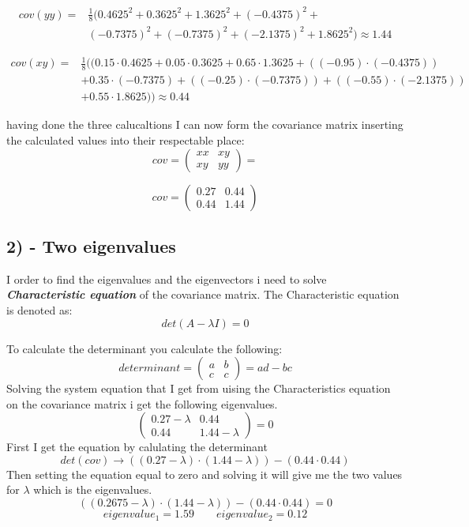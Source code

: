 \begin{equation}
    \begin{split}
        cov(yy) = & \frac{1}{8} \Big(0.4625^2 + 0.3625^2 + 1.3625^2 + (-0.4375)^2 + \\
                  &(-0.7375)^2 + (-0.7375)^2 + (-2.1375)^2 + 1.8625^2 \Big) \approx 1.44
    \end{split}
\end{equation}

\begin{equation}
    \begin{split}
        cov(xy) = & \frac{1}{8} \Big( (0.15\cdot 0.4625 + 0.05 \cdot 0.3625 + 0.65 \cdot  1.3625 + ((-0.95)\cdot (-0.4375))\\
                  &  + 0.35 \cdot (-0.7375) + ((-0.25)\cdot (-0.7375)) + ((-0.55)\cdot (-2.1375))\\
                  &  + 0.55 \cdot 1.8625) \Big) \approx 0.44
    \end{split}
\end{equation}

having done the three calucaltions I can now form the covariance matrix inserting the calculated
values into their respectable place:
$$
cov = \begin{pmatrix}
    xx & xy \\
    xy & yy
 \end{pmatrix}
 = 
$$

$$ cov = \begin{pmatrix}
            0.27 & 0.44 \\
            0.44 & 1.44
         \end{pmatrix}$$


\subsection{2) - Two eigenvalues}
I order to find the eigenvalues and the eigenvectors i need to solve \textbf{\textit{Characteristic equation}} of the
covariance matrix.
The Characteristic equation is denoted as: 
$$det(A - \lambda I) = 0$$

To calculate the determinant you calculate the following:
$$
determinant = \begin{pmatrix}
                a & b \\
                c & c
              \end{pmatrix}
= ad - bc
$$
Solving the system equation that I get from uising the Characteristics equation on the covariance matrix
i get the following eigenvalues.
$$\begin{pmatrix}
    0.27 - \lambda & 0.44 \\
    0.44 & 1.44 - \lambda
\end{pmatrix}
= 0
$$
First I get the equation by calulating the determinant
$$det(cov) \rightarrow ((0.27 - \lambda) \cdot (1.44 - \lambda)) - (0.44 \cdot 0.44) $$
Then setting the equation equal to zero and solving it will give me the two values for $\lambda$ which is the
eigenvalues.
$$((0.2675 - \lambda) \cdot (1.44 - \lambda)) - (0.44 \cdot 0.44) = 0$$
$$eigenvalue_1 = 1.59 \quad \quad eigenvalue_2 = 0.12$$


